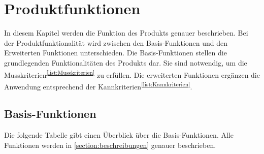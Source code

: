 \section{Produktfunktionen}
In diesem Kapitel werden die Funktion des Produkts genauer beschrieben. Bei der Produktfunktionalität wird zwischen den Basis-Funktionen und den Erweiterten Funktionen unterschieden. Die Basis-Funktionen stellen die grundlegenden Funktionalitäten des Produkts dar. Sie sind notwendig, um die Musskriterien\textsuperscript{\ref{list:Musskriterien}} zu erfüllen. Die erweiterten Funktionen ergänzen die Anwendung entsprechend der Kannkriterien\textsuperscript{\ref{list:Kannkriterien}}.

\subsection{Basis-Funktionen}
Die folgende Tabelle gibt einen Überblick über die Basis-Funktionen. Alle Funktionen werden in \ref{section:beschreibungen} genauer beschrieben.\\

